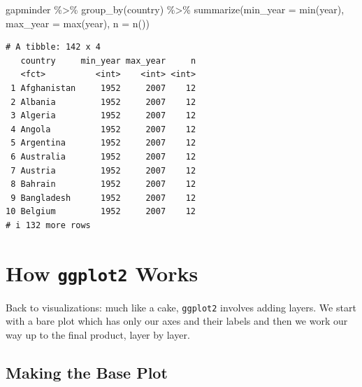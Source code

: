\documentclass[
  letterpaper,
]{book}
\newenvironment{Shaded}{\begin{snugshade}}{\end{snugshade}}
\newcommand{\AttributeTok}[1]{\textcolor[rgb]{0.40,0.45,0.13}{#1}}
\newcommand{\FunctionTok}[1]{\textcolor[rgb]{0.28,0.35,0.67}{#1}}
\newcommand{\NormalTok}[1]{\textcolor[rgb]{0.00,0.23,0.31}{#1}}
\newcommand{\SpecialCharTok}[1]{\textcolor[rgb]{0.37,0.37,0.37}{#1}}
\begin{document}
\begin{tcolorbox}[enhanced jigsaw, colframe=quarto-callout-tip-color-frame, colback=white, title=\textcolor{quarto-callout-tip-color}{\faLightbulb}\hspace{0.5em}{Answer}, opacitybacktitle=0.6, coltitle=black, colbacktitle=quarto-callout-tip-color!10!white, arc=.35mm, leftrule=.75mm, bottomtitle=1mm, bottomrule=.15mm, breakable, opacityback=0, titlerule=0mm, rightrule=.15mm, left=2mm, toptitle=1mm, toprule=.15mm]

\begin{Shaded}
\begin{Highlighting}[]
\NormalTok{gapminder }\SpecialCharTok{\%\textgreater{}\%}
  \FunctionTok{group\_by}\NormalTok{(country) }\SpecialCharTok{\%\textgreater{}\%}
    \FunctionTok{summarize}\NormalTok{(}\AttributeTok{min\_year =} \FunctionTok{min}\NormalTok{(year),}
              \AttributeTok{max\_year =} \FunctionTok{max}\NormalTok{(year),}
              \AttributeTok{n =} \FunctionTok{n}\NormalTok{())}
\end{Highlighting}
\end{Shaded}

\begin{verbatim}
# A tibble: 142 x 4
   country     min_year max_year     n
   <fct>          <int>    <int> <int>
 1 Afghanistan     1952     2007    12
 2 Albania         1952     2007    12
 3 Algeria         1952     2007    12
 4 Angola          1952     2007    12
 5 Argentina       1952     2007    12
 6 Australia       1952     2007    12
 7 Austria         1952     2007    12
 8 Bahrain         1952     2007    12
 9 Bangladesh      1952     2007    12
10 Belgium         1952     2007    12
# i 132 more rows
\end{verbatim}

\end{tcolorbox}

\hypertarget{how-ggplot2-works}{%
\section{\texorpdfstring{How \texttt{ggplot2}
Works}{How ggplot2 Works}}\label{how-ggplot2-works}}

Back to visualizations: much like a cake, \texttt{ggplot2} involves
adding layers. We start with a bare plot which has only our axes and
their labels and then we work our way up to the final product, layer by
layer.

\hypertarget{making-the-base-plot}{%
\subsection{Making the Base Plot}\label{making-the-base-plot}}
\end{document}
